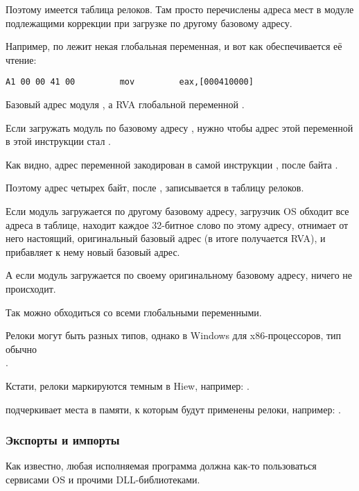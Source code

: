 Поэтому имеется таблица релоков. 
Там просто перечислены адреса мест в модуле подлежащими коррекции при загрузке по другому базовому адресу.

Например, по  лежит некая глобальная переменная, и вот как обеспечивается её чтение:

\begin{lstlisting}
A1 00 00 41 00         mov         eax,[000410000]
\end{lstlisting}

Базовый адрес модуля , а \ac{RVA} глобальной переменной .

Если загружать модуль по базовому адресу , нужно чтобы адрес этой переменной в этой инструкции стал .

Как видно, адрес переменной закодирован в самой инструкции , после байта .

Поэтому адрес четырех байт, после , записывается в таблицу релоков.

Если модуль загружается по другому базовому адресу,
загрузчик \ac{OS} обходит все адреса в таблице, 
находит каждое 32-битное слово по этому адресу,
отнимает от него настоящий, оригинальный базовый адрес
(в итоге получается \ac{RVA}), и прибавляет к нему новый базовый адрес.

А если модуль загружается по своему оригинальному базовому адресу, ничего не происходит.

Так можно обходиться со всеми глобальными переменными.

Релоки могут быть разных типов, однако в Windows для x86-процессоров, тип обычно \\
.

Кстати, релоки маркируются темным в Hiew, например: .

\myindex{\olly}
\olly подчеркивает места в памяти, к которым будут применены релоки, например: .

\subsubsection{Экспорты и импорты}

\label{PE_exports_imports}
Как известно, любая исполняемая программа должна как-то пользоваться сервисами \ac{OS} и прочими DLL-библиотеками.

